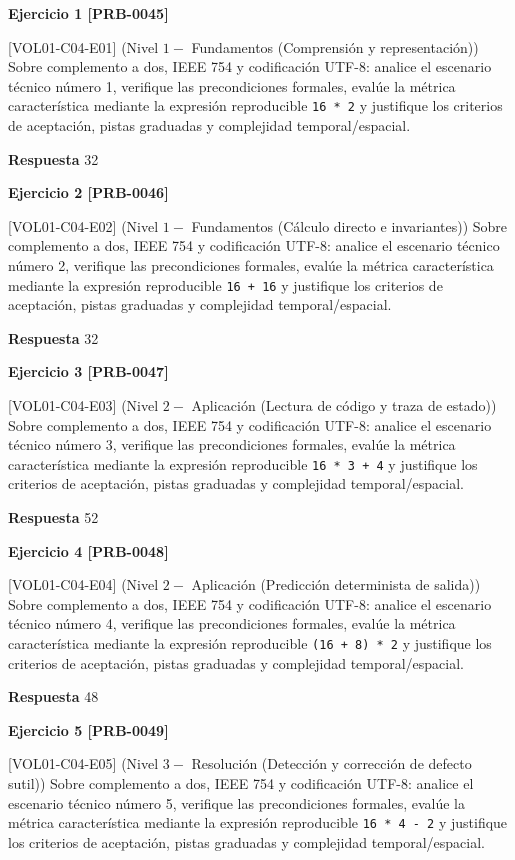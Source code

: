 \documentclass{book}
\begin{document}
\noindent\textbf{Ejercicio 1 [PRB-0045]}

[VOL01-C04-E01] (Nivel \(1 -\) Fundamentos (Comprensión y representación)) Sobre complemento a dos, IEEE 754 y codificación UTF-8: analice el escenario técnico número 1, verifique las precondiciones formales, evalúe la métrica característica mediante la expresión reproducible \texttt{16 * 2} y justifique los criterios de aceptación, pistas graduadas y complejidad temporal/espacial.

\noindent\textbf{Respuesta} 32

\noindent\textbf{Ejercicio 2 [PRB-0046]}

[VOL01-C04-E02] (Nivel \(1 -\) Fundamentos (Cálculo directo e invariantes)) Sobre complemento a dos, IEEE 754 y codificación UTF-8: analice el escenario técnico número 2, verifique las precondiciones formales, evalúe la métrica característica mediante la expresión reproducible \texttt{16 + 16} y justifique los criterios de aceptación, pistas graduadas y complejidad temporal/espacial.

\noindent\textbf{Respuesta} 32

\noindent\textbf{Ejercicio 3 [PRB-0047]}

[VOL01-C04-E03] (Nivel \(2 -\) Aplicación (Lectura de código y traza de estado)) Sobre complemento a dos, IEEE 754 y codificación UTF-8: analice el escenario técnico número 3, verifique las precondiciones formales, evalúe la métrica característica mediante la expresión reproducible \texttt{16 * 3 + 4} y justifique los criterios de aceptación, pistas graduadas y complejidad temporal/espacial.

\noindent\textbf{Respuesta} 52

\noindent\textbf{Ejercicio 4 [PRB-0048]}

[VOL01-C04-E04] (Nivel \(2 -\) Aplicación (Predicción determinista de salida)) Sobre complemento a dos, IEEE 754 y codificación UTF-8: analice el escenario técnico número 4, verifique las precondiciones formales, evalúe la métrica característica mediante la expresión reproducible \texttt{(16 + 8) * 2} y justifique los criterios de aceptación, pistas graduadas y complejidad temporal/espacial.

\noindent\textbf{Respuesta} 48

\noindent\textbf{Ejercicio 5 [PRB-0049]}

[VOL01-C04-E05] (Nivel \(3 -\) Resolución (Detección y corrección de defecto sutil)) Sobre complemento a dos, IEEE 754 y codificación UTF-8: analice el escenario técnico número 5, verifique las precondiciones formales, evalúe la métrica característica mediante la expresión reproducible \texttt{16 * 4 - 2} y justifique los criterios de aceptación, pistas graduadas y complejidad temporal/espacial.
\end{document}
